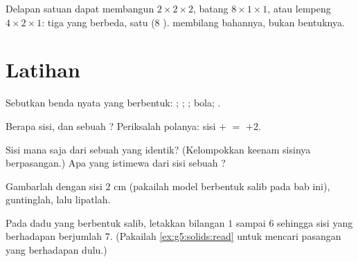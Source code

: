 \begin{example}\label{ex:g5:solids:rearrange}
Delapan  satuan dapat membangun  $2 \times 2 \times 2$,
batang $8 \times 1 \times 1$, atau lempeng $4 \times 2 \times 1$:
tiga  yang berbeda, satu  ($8$ ). 
membilang bahannya, bukan bentuknya.
\end{example}

\section{Latihan}

\begin{exercise}[$\star$]\label{exo:g5:solids:1}
Sebutkan benda nyata yang berbentuk: ; ; ; bola;
.
\end{exercise}

\begin{exercise}[$\star$]\label{exo:g5:solids:2}
Berapa sisi,  dan  sebuah ? Periksalah polanya:
sisi $+$  $=$  $+ 2$.
\end{exercise}

\begin{exercise}[$\star$]\label{exo:g5:solids:3}
Sisi mana saja dari sebuah  yang identik? (Kelompokkan keenam
sisinya berpasangan.) Apa yang istimewa dari sisi sebuah ?
\end{exercise}

\begin{exercise}[$\star$]\label{exo:g5:solids:4}
Gambarlah   dengan sisi $2$ cm (pakailah model
berbentuk salib pada bab ini), guntinglah, lalu lipatlah.
\end{exercise}

\begin{exercise}[$\star$]\label{exo:g5:solids:5}
Pada  dadu yang berbentuk salib, letakkan bilangan $1$
sampai $6$ sehingga sisi yang berhadapan berjumlah $7$. (Pakailah
\cref{ex:g5:solids:read} untuk mencari pasangan yang berhadapan dulu.)
\end{exercise}


